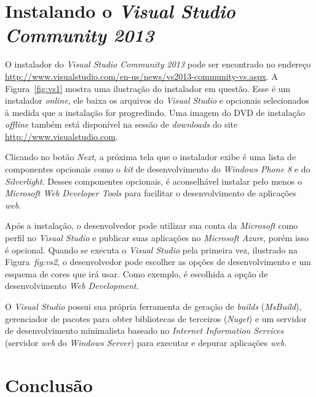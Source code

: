 
\section{Instalando o \textit{Visual Studio Community 2013}} 

O instalador do \textit{Visual Studio Community 2013} pode ser encontrado no endereço \url{http://www.visualstudio.com/en-us/news/vs2013-community-vs.aspx}. A Figura~\ref{fig:vs1} mostra uma ilustração do instalador em questão. Esse é um instalador \textit{online}, ele baixa os arquivos do \textit{Visual Studio} e opcionais selecionados à medida que a instalação for progredindo. Uma imagem do DVD de instalação \textit{offline} também está disponível na sessão de \textit{downloads} do site \url{http://www.visualstudio.com}.


Clicando no botão \textit{Next}, a próxima tela que o instalador exibe é uma lista de componentes opcionais como o \textit{kit} de desenvolvimento do \textit{Windows Phone 8} e do \textit{Silverlight}. Desses componentes opcionais, é aconselhável instalar pelo menos o \textit{Microsoft Web Developer Tools} para facilitar o desenvolvimento de aplicações \textit{web}.

Após a instalação, o desenvolvedor pode utilizar sua conta da \textit{Microsoft} como perfil no \textit{Visual Studio} e publicar suas aplicações no \textit{Microsoft Azure}, porém isso é opcional. Quando se executa o \textit{Visual Studio} pela primeira vez, ilustrado na Figura~\textit{fig:vs2}, o desenvolvedor pode escolher as opções de desenvolvimento e um esquema de cores que irá usar. Como exemplo, é escolhida a opção de desenvolvimento \textit{Web Development}.


O \textit{Visual Studio} possui sua própria ferramenta de geração de \textit{builds} (\textit{MsBuild}), gerenciador de pacotes para obter bibliotecas de terceiros (\textit{Nuget}) e um servidor de desenvolvimento minimalista baseado no \textit{Internet Information Services} (servidor \textit{web} do \textit{Windows Server}) para executar e depurar aplicações \textit{web}.  

\section{Conclusão}

